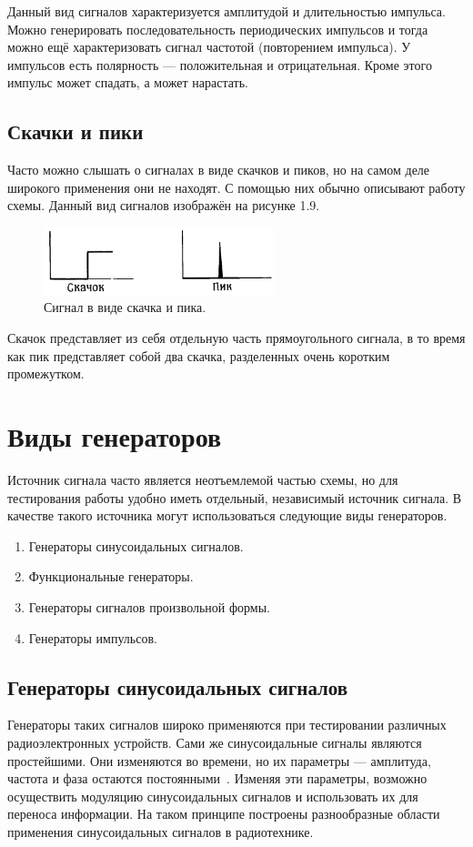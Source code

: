 	Данный вид сигналов характеризуется амплитудой и длительностью импульса. Можно генерировать последовательность периодических импульсов и тогда можно ещё характеризовать сигнал частотой (повторением импульса). У импульсов есть полярность --- положительная и отрицательная. Кроме этого импульс может спадать, а может нарастать. 
	


\subsection{Скачки и пики}
	Часто можно слышать о сигналах в виде скачков и пиков, но на самом деле широкого применения они не находят. С помощью них обычно описывают работу схемы. Данный вид сигналов изображён на рисунке 1.9.

	\begin{figure}[H]
    \centering
    \includegraphics[width=0.6\textwidth]{../image/s_sp.png}
    \caption{Сигнал в виде скачка и пика.}
	\end{figure}

	Скачок представляет из себя отдельную часть прямоугольного сигнала, в то время как пик представляет собой два скачка, разделенных очень коротким промежутком.


\section{Виды генераторов}
	Источник сигнала часто является неотъемлемой частью схемы, но для тестирования работы удобно иметь отдельный, независимый источник сигнала. В качестве такого источника могут использоваться следующие виды генераторов.
\begin{enumerate}
	\item Генераторы синусоидальных сигналов.
	\item Функциональные генераторы.
	\item Генераторы сигналов произвольной формы.
	\item Генераторы импульсов.
\end{enumerate}

\subsection{Генераторы синусоидальных сигналов}
	Генераторы таких сигналов широко применяются при тестировании различных радиоэлектронных устройств. Сами же синусоидальные сигналы являются простейшими. Они изменяются во времени, но их параметры --- амплитуда, частота и фаза остаются постоянными~\cite{dgs}. Изменяя эти параметры, возможно осуществить модуляцию синусоидальных сигналов и использовать их для переноса информации. На таком принципе построены разнообразные области применения синусоидальных сигналов в радиотехнике.

